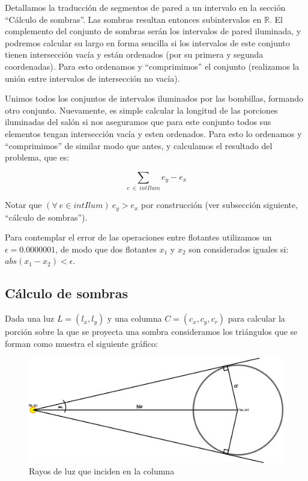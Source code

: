 Detallamos la traducción de segmentos de pared a un intervalo en la sección
``Cálculo de sombras''. Las sombras resultan entonces subintervalos en $\mathbb R$.
El complemento del conjunto de sombras serán los intervalos de pared iluminada,
y podremos calcular su largo en forma sencilla si los intervalos de este conjunto tienen
intersección vacía y están ordenados (por su primera y segunda coordenadas). Para esto ordenamos y
``comprimimos'' el conjunto (realizamos la unión entre intervalos de intersección no vacía).

Unimos todos los conjuntos de intervalos iluminados por las bombillas, formando otro conjunto.
Nuevamente, es simple calcular la longitud de las porciones iluminadas del salón si nos aseguramos que
para este conjunto todos sus elementos tengan intersección vacía y esten ordenados. Para esto lo
ordenamos y ``comprimimos'' de similar modo que antes, y calculamos el resultado del problema, que es:

\begin{center}
$$\sum_{e\ \in\ intIlum}e_y - e_x$$
\end{center}

Notar que $(\forall\ e \in intIlum)\ e_y > e_x$ por construcción (ver
subsección siguiente, ``cálculo de sombras'').

Para contemplar el error de las operaciones entre flotantes utilizamos un $\epsilon = 0.0000001$, 
de modo que dos flotantes $x_1$ y $x_2$ son considerados iguales si: $abs(x_1 - x_2) < \epsilon$.

\subsection*{Cálculo de sombras}
Dada una luz $L = (l_x, l_y)$ y una columna $C = (c_x, c_y, c_r)$ para calcular la porción sobre
la que se proyecta una sombra consideramos los triángulos que se forman como muestra el siguiente
gráfico:

\begin{figure}[H]
\centering
\label{bl_3}
\caption{\sc Rayos de luz que inciden en la columna}
\includegraphics[scale=1.0]{./figuras/bl_3.png}
\end{figure} 

